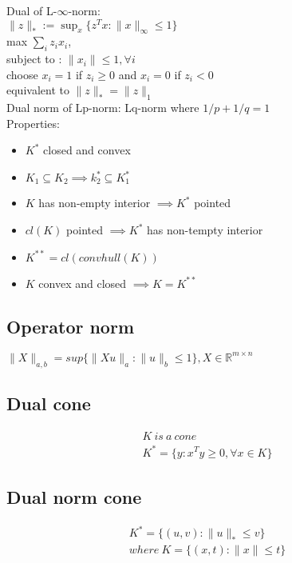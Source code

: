 \documentclass[8pt]{report}
\newcommand{\R}{\mathbb{R}}
\newcommand{\norm}[1]{\|#1\|}
\newcommand{\set}[1]{\{#1\}}
\begin{document}
\begin{multicols*}{2}
  Dual of L-$\infty$-norm:\\
  $\|z\|_* := \sup_x \{z^T x : \|x\|_{\infty} \leq 1\}$\\
  max $\sum_i z_i x_i$,\\
  subject to : $\|x_i\| \leq 1, \forall i$\\
  choose $x_i=1$ if $z_i \geq 0$ and $x_i=0$ if $z_i < 0$\\
  equivalent to $\|z\|_* = \|z\|_1$\\

  Dual norm of Lp-norm: Lq-norm where $1/p + 1/q = 1$\\

  Properties:
  \begin{itemize}
  \item $K^*$ closed and convex
  \item $K_1 \subseteq K_2 \implies k_2^* \subseteq K_1^*$
  \item $K$ has non-empty interior $\implies K^*$ pointed
  \item $cl(K)$ pointed $\implies K^*$ has non-tempty interior
  \item $K^{**} = cl(convhull(K))$
  \item $K$ convex and closed $\implies K=K^{**}$
  \end{itemize}
  
  \subsection{Operator norm}
  $\norm{X}_{a,b}=sup\{\norm{Xu}_a : \norm{u}_b \leq 1 \}, X \in \R^{m\times n}$
  
  \subsection{Dual cone}
  \begin{align*}
    K\ is\ a\ cone\\
    K^* = \{y:x^T y \geq 0, \forall x \in K\}
  \end{align*}

  \subsection{Dual norm cone}

  \begin{align*}
    K^* = \set{(u,v): \norm{u}_* \leq v}\\
    where\ K = \set{(x,t): \norm{x} \leq t}
  \end{align*}
  

\end{multicols*}
\end{document}
